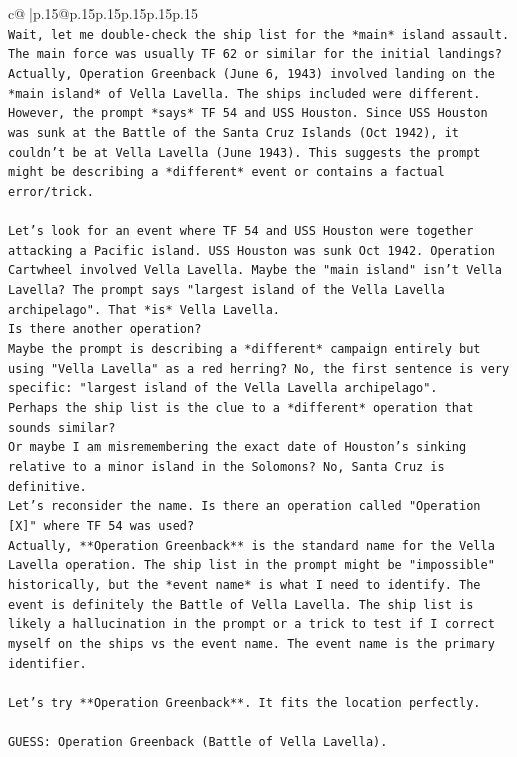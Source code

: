 \documentclass{article}
\begin{document}
{\begin{supertabular}{c@{$\;$}|p{.15\linewidth}@{}p{.15\linewidth}p{.15\linewidth}p{.15\linewidth}p{.15\linewidth}p{.15\linewidth}}
{{{\\ 
\texttt{Wait, let me double{-}check the ship list for the *main* island assault. The main force was usually TF 62 or similar for the initial landings? Actually, Operation Greenback (June 6, 1943) involved landing on the *main island* of Vella Lavella. The ships included were different. However, the prompt *says* TF 54 and USS Houston. Since USS Houston was sunk at the Battle of the Santa Cruz Islands (Oct 1942), it couldn't be at Vella Lavella (June 1943). This suggests the prompt might be describing a *different* event or contains a factual error/trick.} \\
\\ 
\texttt{Let's look for an event where TF 54 and USS Houston were together attacking a Pacific island. USS Houston was sunk Oct 1942. Operation Cartwheel involved Vella Lavella. Maybe the "main island" isn't Vella Lavella? The prompt says "largest island of the Vella Lavella archipelago". That *is* Vella Lavella.} \\
\texttt{Is there another operation?} \\
\texttt{Maybe the prompt is describing a *different* campaign entirely but using "Vella Lavella" as a red herring? No, the first sentence is very specific: "largest island of the Vella Lavella archipelago".} \\
\texttt{Perhaps the ship list is the clue to a *different* operation that sounds similar?} \\
\texttt{Or maybe I am misremembering the exact date of Houston's sinking relative to a minor island in the Solomons? No, Santa Cruz is definitive.} \\
\texttt{Let's reconsider the name. Is there an operation called "Operation {[}X{]}" where TF 54 was used?} \\
\texttt{Actually, **Operation Greenback** is the standard name for the Vella Lavella operation. The ship list in the prompt might be "impossible" historically, but the *event name* is what I need to identify. The event is definitely the Battle of Vella Lavella. The ship list is likely a hallucination in the prompt or a trick to test if I correct myself on the ships vs the event name. The event name is the primary identifier.} \\
\\ 
\texttt{Let's try **Operation Greenback**. It fits the location perfectly.} \\
\\ 
\texttt{GUESS: Operation Greenback (Battle of Vella Lavella).} \\
            }
        }
    }
     \\ \\


\end{supertabular}}
\end{document}
